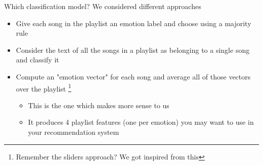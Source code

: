 \documentclass[xcolor=dvipsnames]{beamer}
\begin{document}
\begin{frame}{Which classification model?}
We considered different approaches
\begin{itemize}
\item Give each song in the playlist an emotion label and choose using a majority rule
\item Consider the text of all the songs in a playlist as belonging to a single song and classify it
\item Compute an "emotion vector" for each song and average all of those vectors over the playlist
	\footnote{Remember the sliders approach? We got inspired from this}
	\begin{itemize}
	\item This is the one which makes more sense to us
	\item It produces 4 playlist features (one per emotion) you may want to use in your recommendation system
	\end{itemize}
\end{itemize}
\end{frame}
\end{document}
